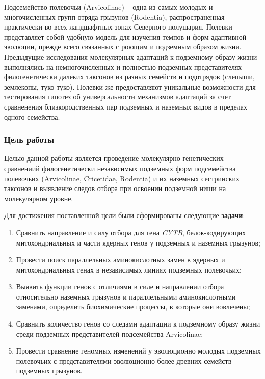 Подсемейство полевочьи (Arvicolinae) -- одна из самых молодых и многочисленных групп отряда грызунов (Rodentia), распространенная практически во всех ландшафтных зонах Северного полушария. Полевки представляет собой удобную модель для изучения темпов и форм адаптивной эволюции, прежде всего связанных с роющим и подземным образом жизни. Предыдущие исследования молекулярных адаптаций к подземному образу жизни выполнялись на немногочисленных и полностью подземных представителях филогенетически далеких таксонов из разных семейств и подотрядов (слепыши, землекопы, туко-туко). Полевки же предоставляют уникальные возможности для тестирования гипотез об универсальности механизмов адаптаций за счет сравненения близкородственных пар подземных и наземных видов в пределах одного семейства. 

\subsubsection* {Цель работы}

Целью данной работы является проведение молекулярно-генетических сравнениий филогенетически независимых подземных форм подсемейства полевочьих (Arvicolinae, Cricetidae, Rodentia) и их наземных сестринских таксонов и выявление следов отбора при освоении подземной ниши на молекулярном уровне.
\vspace{3mm}

Для достижения поставленной цели были сформированы следующие \textbf{задачи}:

\vspace{3mm}

\begin{enumerate}
	\item Сравнить направление и силу отбора для гена \textit{CYTB}, белок-кодирующих митохондриальных и части ядерных генов у подземных и наземных грызунов;
	\item Провести поиск параллельных аминокислотных замен в ядерных и митохондриальных генах в независимых линиях подземных полевочьих;
	\item Выявить функции генов с отличиями в силе и направлении отбора относительно наземных грызунов и параллельными аминокислотными заменами, определить биохимические процессы, в которые они вовлечены;
	\item Сравнить количество генов со следами адаптации к подземному образу жизни среди подземных представителей подсемейства Arvicolinae;
	\item Провести сравнение геномных изменений у эволюционно молодых подземных полевочьих с представителями эволюционно более древних семейств подземных грызунов. 
\end{enumerate}
%

